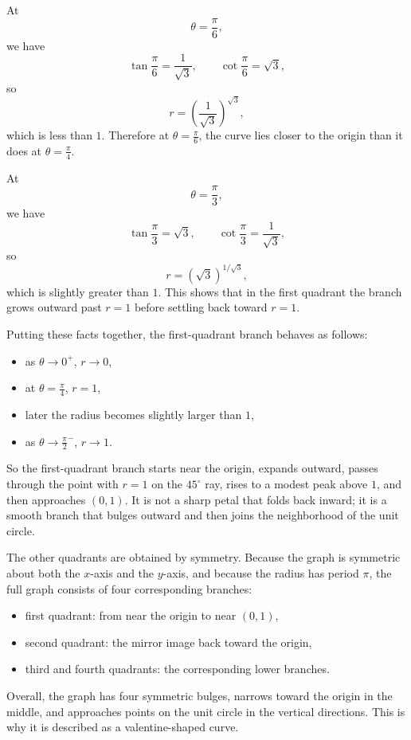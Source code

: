 \documentclass[a4paper,12pt,twocolumn]{article}
\newenvironment{solutionbox}{\begin{framed}}{\end{framed}}
\begin{document}
\begin{solutionbox}
\begin{steps}
At
\[
\theta=\frac{\pi}{6},
\]
we have
\[
\tan\frac{\pi}{6}=\frac{1}{\sqrt3},
\qquad
\cot\frac{\pi}{6}=\sqrt3,
\]
so
\[
r=\left(\frac{1}{\sqrt3}\right)^{\sqrt3},
\]
which is less than \(1\). Therefore at \(\theta=\frac{\pi}{6}\), the curve lies closer to the origin than it does at \(\theta=\frac{\pi}{4}\).

At
\[
\theta=\frac{\pi}{3},
\]
we have
\[
\tan\frac{\pi}{3}=\sqrt3,
\qquad
\cot\frac{\pi}{3}=\frac{1}{\sqrt3},
\]
so
\[
r=(\sqrt3)^{1/\sqrt3},
\]
which is slightly greater than \(1\). This shows that in the first quadrant the branch grows outward past \(r=1\) before settling back toward \(r=1\).

\item Putting these facts together, the first-quadrant branch behaves as follows:
\begin{itemize}[leftmargin=*]
\item as \(\theta\to 0^+\), \(r\to 0\),
\item at \(\theta=\frac{\pi}{4}\), \(r=1\),
\item later the radius becomes slightly larger than \(1\),
\item as \(\theta\to \frac{\pi}{2}^{-}\), \(r\to 1\).
\end{itemize}
So the first-quadrant branch starts near the origin, expands outward, passes through the point with \(r=1\) on the \(45^\circ\) ray, rises to a modest peak above \(1\), and then approaches \((0,1)\). It is not a sharp petal that folds back inward; it is a smooth branch that bulges outward and then joins the neighborhood of the unit circle.

\item The other quadrants are obtained by symmetry. Because the graph is symmetric about both the \(x\)-axis and the \(y\)-axis, and because the radius has period \(\pi\), the full graph consists of four corresponding branches:
\begin{itemize}[leftmargin=*]
\item first quadrant: from near the origin to near \((0,1)\),
\item second quadrant: the mirror image back toward the origin,
\item third and fourth quadrants: the corresponding lower branches.
\end{itemize}
Overall, the graph has four symmetric bulges, narrows toward the origin in the middle, and approaches points on the unit circle in the vertical directions. This is why it is described as a valentine-shaped curve.
\end{steps}
\end{solutionbox}
\end{document}
